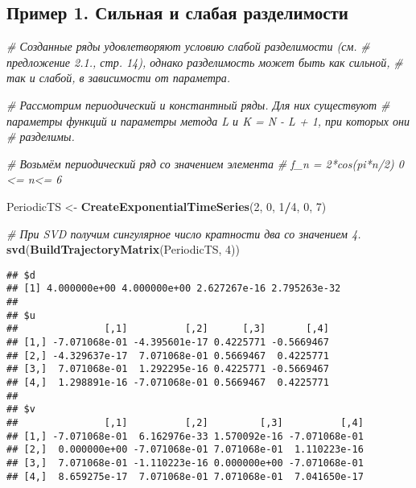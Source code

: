 \documentclass[
]{article}
\newenvironment{Shaded}{\begin{snugshade}}{\end{snugshade}}
\newcommand{\CommentTok}[1]{\textcolor[rgb]{0.56,0.35,0.01}{\textit{#1}}}
\newcommand{\DecValTok}[1]{\textcolor[rgb]{0.00,0.00,0.81}{#1}}
\newcommand{\FunctionTok}[1]{\textcolor[rgb]{0.13,0.29,0.53}{\textbf{#1}}}
\newcommand{\NormalTok}[1]{#1}
\newcommand{\OtherTok}[1]{\textcolor[rgb]{0.56,0.35,0.01}{#1}}
\newcommand{\SpecialCharTok}[1]{\textcolor[rgb]{0.81,0.36,0.00}{\textbf{#1}}}
\begin{document}
\subsection{Пример 1. Сильная и слабая
разделимости}\label{ux43fux440ux438ux43cux435ux440-1.-ux441ux438ux43bux44cux43dux430ux44f-ux438-ux441ux43bux430ux431ux430ux44f-ux440ux430ux437ux434ux435ux43bux438ux43cux43eux441ux442ux438}

\begin{Shaded}
\begin{Highlighting}[]
\CommentTok{\# Созданные ряды удовлетворяют условию слабой разделимости (см.}
\CommentTok{\# предложение 2.1., стр. 14), однако разделимость может быть как сильной,}
\CommentTok{\# так и слабой, в зависимости от параметра.}

\CommentTok{\# Рассмотрим периодический и константный ряды. Для них существуют}
\CommentTok{\# параметры функций и параметры метода L и K = N {-} L + 1, при которых они}
\CommentTok{\# разделимы.}

\CommentTok{\# Возьмём периодический ряд со значением элемента }
\CommentTok{\# f\_n = 2*cos(pi*n/2) 0 \textless{}= n\textless{}= 6 }

\NormalTok{PeriodicTS }\OtherTok{\textless{}{-}} \FunctionTok{CreateExponentialTimeSeries}\NormalTok{(}\DecValTok{2}\NormalTok{, }\DecValTok{0}\NormalTok{, }\DecValTok{1}\SpecialCharTok{/}\DecValTok{4}\NormalTok{, }\DecValTok{0}\NormalTok{, }\DecValTok{7}\NormalTok{)}

\CommentTok{\# При SVD получим сингулярное число кратности два со значением 4.}
\FunctionTok{svd}\NormalTok{(}\FunctionTok{BuildTrajectoryMatrix}\NormalTok{(PeriodicTS, }\DecValTok{4}\NormalTok{))}
\end{Highlighting}
\end{Shaded}

\begin{verbatim}
## $d
## [1] 4.000000e+00 4.000000e+00 2.627267e-16 2.795263e-32
## 
## $u
##               [,1]          [,2]      [,3]       [,4]
## [1,] -7.071068e-01 -4.395601e-17 0.4225771 -0.5669467
## [2,] -4.329637e-17  7.071068e-01 0.5669467  0.4225771
## [3,]  7.071068e-01  1.292295e-16 0.4225771 -0.5669467
## [4,]  1.298891e-16 -7.071068e-01 0.5669467  0.4225771
## 
## $v
##               [,1]          [,2]         [,3]          [,4]
## [1,] -7.071068e-01  6.162976e-33 1.570092e-16 -7.071068e-01
## [2,]  0.000000e+00 -7.071068e-01 7.071068e-01  1.110223e-16
## [3,]  7.071068e-01 -1.110223e-16 0.000000e+00 -7.071068e-01
## [4,]  8.659275e-17  7.071068e-01 7.071068e-01  7.041650e-17
\end{verbatim}
\end{document}
